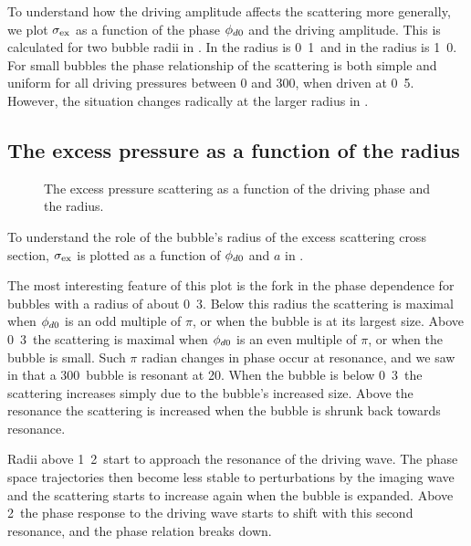 To understand how the driving amplitude affects the scattering more generally,
we plot  $\sigma_\textrm{ex}$ as a function of the phase ${\phi_{d0}}$ and the driving amplitude.
This is calculated for two bubble radii in .
In  the radius is \unit{0.1}\micro\metre\ and
in  the radius is \unit{1.0}\micro\metre. %
For small bubbles the phase relationship of the scattering is both simple and uniform for all driving pressures between 0 and \unit{300}\kilo\pascal,
when driven at \unit{0.5}\mega\hertz.
However, the situation changes radically at the larger radius in .





\subsection{The excess pressure as a function of the radius}

\begin{figure}
 \centering
  
  \caption{
    The excess pressure scattering as a function of the driving phase and the radius.
  }
 \label{fig:phase_radial}
\end{figure}

To understand the role of the bubble's radius of the excess scattering cross section,
$\sigma_\textrm{ex}$ is plotted as a function of ${\phi_{d0}}$ and $a$ in .

The most interesting feature of this plot is the fork in the phase dependence for bubbles with a radius of about \unit{0.3}\micro\metre.
Below this radius the scattering is maximal when ${\phi_{d0}}$ is an odd multiple of $\pi$,
or when the bubble is at its largest size.
Above  \unit{0.3}\micro\metre\ the scattering is maximal when ${\phi_{d0}}$ is an even multiple of $\pi$,
or when the bubble is small.
Such $\pi$ radian changes in phase occur at resonance,
and we saw in  that a \unit{300}\nano\metre\ bubble is resonant at \unit{20}\mega\hertz.
When the bubble is below \unit{0.3}\micro\metre\ the scattering increases simply due to the bubble's increased size.
Above the resonance the scattering is increased when the bubble is shrunk back towards resonance.

Radii above \unit{1.2}\micro\metre\ start to approach the resonance of the driving wave.
The phase space trajectories then become less stable to perturbations by the imaging wave and the scattering
starts to increase again when the bubble is expanded.
Above \unit{2}\micro\metre\ the phase response to the driving wave starts to shift with this second resonance,
and the phase relation breaks down.


